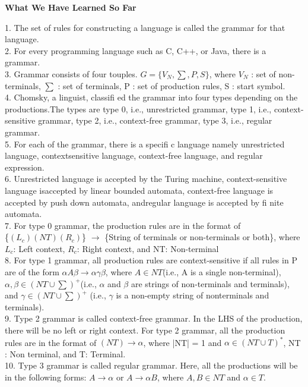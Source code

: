 \documentclass[12pt]{book}
\begin{document}
\begin{center}
\textbf{\Large What We Have Learned So Far}\\
\end{center}
1. The set of rules for constructing a language is called the grammar for that language.\\
2. For every programming language such as C, C++, or Java, there is a grammar.\\
3. Grammar consists of four touples. $G = \{V_N, \sum, P, S\}$, where $V_N$ : set of non-terminals, $\sum$ : set
of terminals, P : set of production rules, S : start symbol.\\
4. Chomsky, a linguist, classifi ed the grammar into four types depending on the productions.The types are type 0, i.e., unrestricted grammar, type 1, i.e., context-sensitive grammar, type 2, i.e., context-free grammar, type 3, i.e., regular grammar.\\
5. For each of the grammar, there is a specifi c language namely unrestricted language, contextsensitive language, context-free language, and regular expression.\\
6. Unrestricted language is accepted by the Turing machine, context-sensitive language isaccepted by linear bounded automata, context-free language is accepted by push down automata, andregular language is accepted by fi nite automata.\\
7. For type 0 grammar, the production rules are in the format of\\ \{$(L_c)(NT)(R_c)$\} $\rightarrow$ \{String of terminals or non-terminals or both\}, where $L_c$: Left context, $R_c$: Right context, and NT: Non-terminal\\
8. For type 1 grammar, all production rules are context-sensitive if all rules in P are of the form $\alpha A\beta \rightarrow \alpha\gamma\beta$, where $A \in NT $(i.e., A is a single non-terminal), $\alpha, \beta \in (NT \cup \sum)^+ $(i.e., $\alpha$ and $\beta$ are strings of non-terminals and terminals), and $\gamma \in (NT \cup \sum)^+ $ (i.e., $\gamma$ is a non-empty string of nonterminals and terminals).\\
9. Type 2 grammar is called context-free grammar. In the LHS of the production, there will be no left or right context. For type 2 grammar, all the production rules are in the format of $(NT) \rightarrow \alpha$, where |NT| = 1 and $\alpha \in (NT \cup T)^*$, NT : Non terminal, and T: Terminal.\\
10. Type 3 grammar is called regular grammar. Here, all the productions will be in the following 
forms: $A \rightarrow \alpha$ or $A \rightarrow \alpha B$, where $A, B \in NT $ and $\alpha \in T.$  
\end{document}
